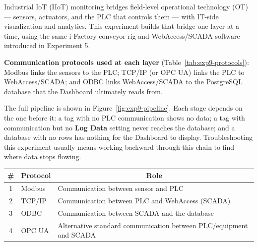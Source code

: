 \begin{introduction}
  Industrial IoT (IIoT) monitoring bridges field-level operational technology (OT) --- sensors, actuators, and the PLC that controls them --- with IT-side visualization and analytics. This experiment builds that bridge one layer at a time, using the same i-Factory conveyor rig and WebAccess/SCADA software introduced in Experiment 5.
  \vspace*{1.5em}

  \textbf{Communication protocols used at each layer} (Table~\ref{tab:exp9-protocols}): Modbus links the sensors to the PLC; TCP/IP (or OPC UA) links the PLC to WebAccess/SCADA; and ODBC links WebAccess/SCADA to the PostgreSQL database that the Dashboard ultimately reads from.
  \vspace*{1.5em}

  The full pipeline is shown in Figure~\ref{fig:exp9-pipeline}. Each stage depends on the one before it: a tag with no PLC communication shows no data; a tag with communication but no \textbf{Log Data} setting never reaches the database; and a database with no rows has nothing for the Dashboard to display. Troubleshooting this experiment usually means working backward through this chain to find where data stops flowing.
\end{introduction}

\begin{boxedtable}
  \label{tab:exp9-protocols}
  \centering
  \begin{tabular}{cll}
    \toprule
    \# & Protocol & \multicolumn{1}{c}{Role}                                           \\
    \midrule
    1  & Modbus   & Communication between sensor and PLC                               \\[1.5em]
    2  & TCP/IP   & Communication between PLC and WebAccess (SCADA)                    \\[1.5em]
    3  & ODBC     & Communication between SCADA and the database                       \\[1.5em]
    4  & OPC UA   & Alternative standard communication between PLC/equipment and SCADA \\
    \bottomrule
  \end{tabular}
\end{boxedtable}
\vspace*{10mm}

